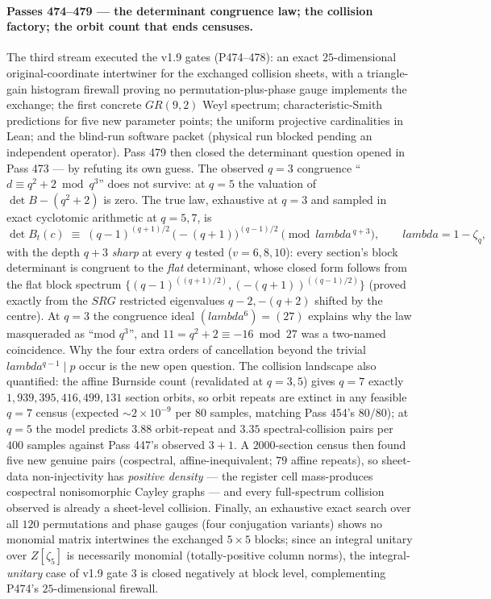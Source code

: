 \documentclass[12pt,a4paper]{article}
\def\mathbb#1{#1}%
\def\mathrm#1{#1}%
\def\textbf#1{#1}%
\def\lambda{lambda}%
\theoremstyle{definition}
\newcommand{\ZZ}{\mathbb{Z}}
\begin{document}
\paragraph{Passes 474--479 --- the determinant congruence law; the collision
factory; the orbit count that ends censuses.}
The third stream executed the v1.9 gates (P474--478): an exact
$25$-dimensional original-coordinate intertwiner for the exchanged collision
sheets, with a triangle-gain histogram firewall proving no permutation-plus-phase
gauge implements the exchange; the first concrete $\mathrm{GR}(9,2)$ Weyl
spectrum; characteristic-Smith predictions for five new parameter points; the
uniform projective cardinalities in Lean; and the blind-run software packet
(physical run blocked pending an independent operator).  Pass 479 then closed
the determinant question opened in Pass 473 --- \textbf{by refuting its own
guess}.  The observed $q=3$ congruence ``$d\equiv q^2{+}2 \bmod q^3$'' does
not survive: at $q=5$ the valuation of $\det B-(q^2{+}2)$ is zero.  The true
law, exhaustive at $q=3$ and sampled in exact cyclotomic arithmetic at
$q=5,7$, is
\[
\det B_t(c)\;\equiv\;(q{-}1)^{(q+1)/2}\,\bigl(-(q{+}1)\bigr)^{(q-1)/2}
\pmod{\lambda^{\,q+3}},\qquad \lambda=1-\zeta_q,
\]
with the depth $q{+}3$ \emph{sharp} at every $q$ tested ($v=6,8,10$): every
section's block determinant is congruent to the \emph{flat} determinant, whose
closed form follows from the flat block spectrum
$\{(q{-}1)^{((q+1)/2)},(-(q{+}1))^{((q-1)/2)}\}$ (proved exactly from the
$\mathrm{SRG}$ restricted eigenvalues $q{-}2,-(q{+}2)$ shifted by the centre).
At $q=3$ the congruence ideal $(\lambda^6)=(27)$ explains why the law
masqueraded as ``mod $q^3$'', and $11=q^2{+}2\equiv-16\bmod 27$ was a
two-named coincidence.  Why the four extra orders of cancellation beyond the
trivial $\lambda^{q-1}\mid p$ occur is the new open question.  The collision
landscape also quantified: the affine Burnside count (revalidated at
$q=3,5$) gives $q=7$ exactly $1{,}939{,}395{,}416{,}499{,}131$ section
orbits, so orbit repeats are extinct in any feasible $q=7$ census
(expected $\sim2\times10^{-9}$ per $80$ samples, matching Pass 454's $80/80$);
at $q=5$ the model predicts $3.88$ orbit-repeat and $3.35$ spectral-collision
pairs per $400$ samples against Pass 447's observed $3{+}1$.  A $2000$-section
census then found \textbf{five new genuine pairs} (cospectral,
affine-inequivalent; $79$ affine repeats), so sheet-data non-injectivity has
\emph{positive density} --- the register cell mass-produces cospectral
nonisomorphic Cayley graphs --- and every full-spectrum collision observed is
already a sheet-level collision.  Finally, an exhaustive exact search over
all $120$ permutations and phase gauges (four conjugation variants) shows
\textbf{no monomial matrix intertwines the exchanged $5\times5$ blocks}; since
an integral unitary over $\ZZ[\zeta_5]$ is necessarily monomial
(totally-positive column norms), the integral-\emph{unitary} case of v1.9
gate 3 is closed negatively at block level, complementing P474's
$25$-dimensional firewall.
\end{document}
